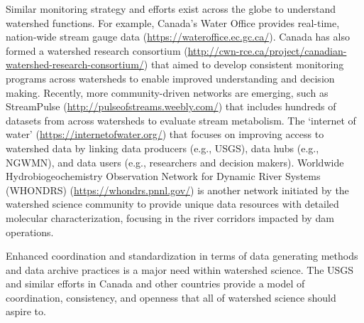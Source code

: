 \documentclass[preprint,review, 12pt]{elsarticle}
\begin{document}
\begin{sloppypar}
Similar monitoring strategy and efforts exist across the globe to understand watershed functions. For example, Canada’s Water Office provides real-time, nation-wide stream gauge data (\url{https://wateroffice.ec.gc.ca/}). Canada has also formed a watershed research consortium (\url{http://cwn-rce.ca/project/canadian-watershed-research-consortium/}) that aimed to develop consistent monitoring programs across watersheds to enable improved understanding and decision making. Recently, more community-driven networks are emerging, such as StreamPulse (\url{http://pulseofstreams.weebly.com/}) that includes hundreds of datasets from across watersheds to evaluate stream metabolism.  The ‘internet of water’ (\url{https://internetofwater.org/}) that focuses on improving access to watershed data by linking data producers (e.g., USGS), data hubs (e.g., NGWMN), and data users (e.g., researchers and decision makers). Worldwide Hydrobiogeochemistry Observation Network for Dynamic River Systems (WHONDRS) (\url{https://whondrs.pnnl.gov/}) \citep{stegen_whondrs_2018} is another network initiated by the watershed science community to provide unique data resources with detailed molecular characterization, focusing in the river corridors impacted by dam operations.
\end{sloppypar}

Enhanced coordination and standardization in terms of data generating methods and data archive practices is a major need within watershed science. The USGS and similar efforts in Canada and other countries provide a model of coordination, consistency, and openness that all of watershed science should aspire to.
            
\end{document}
